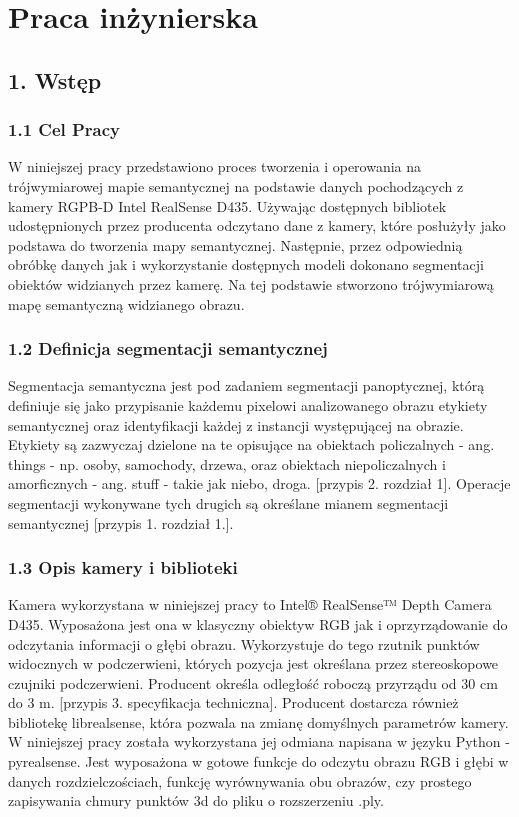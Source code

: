 \documentclass[
]{article}
\author{}
\date{}
\begin{document}
\section{Praca inżynierska}\label{praca-inux17cynierska}

\subsection{1. Wstęp}\label{wstux119p}

\subsubsection{1.1 Cel Pracy}\label{cel-pracy}

W niniejszej pracy przedstawiono proces tworzenia i operowania na trójwymiarowej mapie semantycznej na podstawie danych pochodzących z kamery RGPB-D Intel RealSense D435.
Używając dostępnych bibliotek udostępnionych przez producenta odczytano dane z kamery, które posłużyły jako podstawa do tworzenia mapy semantycznej. Następnie, przez odpowiednią obróbkę danych jak i wykorzystanie dostępnych modeli dokonano segmentacji obiektów widzianych przez kamerę. Na tej podstawie stworzono trójwymiarową mapę semantyczną widzianego obrazu.

\subsubsection{1.2 Definicja segmentacji semantycznej}\label{definicja-segmentacji-semantycznej}

Segmentacja semantyczna jest pod zadaniem segmentacji panoptycznej, którą definiuje się jako przypisanie każdemu pixelowi analizowanego obrazu etykiety semantycznej oraz identyfikacji każdej z instancji występującej na obrazie. Etykiety są zazwyczaj dzielone na te opisujące na obiektach policzalnych - ang. things - np. osoby, samochody, drzewa, oraz obiektach niepoliczalnych i amorficznych - ang. stuff - takie jak niebo, droga. {[}przypis 2. rozdział 1{]}. Operacje segmentacji wykonywane tych drugich są określane mianem segmentacji semantycznej {[}przypis 1. rozdział 1.{]}.

\subsubsection{1.3 Opis kamery i biblioteki}\label{opis-kamery-i-biblioteki}

Kamera wykorzystana w niniejszej pracy to Intel® RealSense™ Depth Camera D435. Wyposażona jest ona w klasyczny obiektyw RGB jak i oprzyrządowanie do odczytania informacji o głębi obrazu. Wykorzystuje do tego rzutnik punktów widocznych w podczerwieni, których pozycja jest określana przez stereoskopowe czujniki podczerwieni. Producent określa odległość roboczą przyrządu od 30 cm do 3 m. {[}przypis 3. specyfikacja techniczna{]}.
Producent dostarcza również bibliotekę librealsense, która pozwala na zmianę domyślnych parametrów kamery. W niniejszej pracy została wykorzystana jej odmiana napisana w języku Python - pyrealsense. Jest wyposażona w gotowe funkcje do odczytu obrazu RGB i głębi w danych rozdzielczościach, funkcję wyrównywania obu obrazów, czy prostego zapisywania chmury punktów 3d do pliku o rozszerzeniu .ply.
\end{document}
